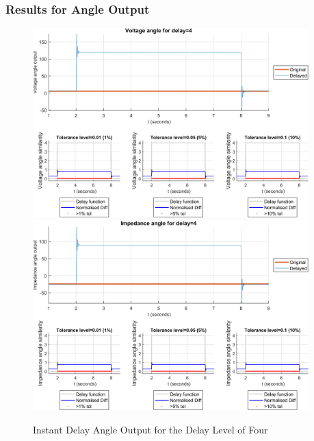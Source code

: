 \subsubsection{Results for Angle Output}


\begin{figure}
    \caption{Instant Delay Angle Output for the Delay Level of Four}
    \includegraphics[width=0.95\textwidth]{PMUsim-figures/DelayOf_4/Instant_vAngle.png}    
   \includegraphics[width=0.95\textwidth]{PMUsim-figures/DelayOf_4/Instant_iAngle.png}    
    \label{fig:PMUsim_Four_Angle}
        \begin{small}
     \end{small}
\end{figure}

